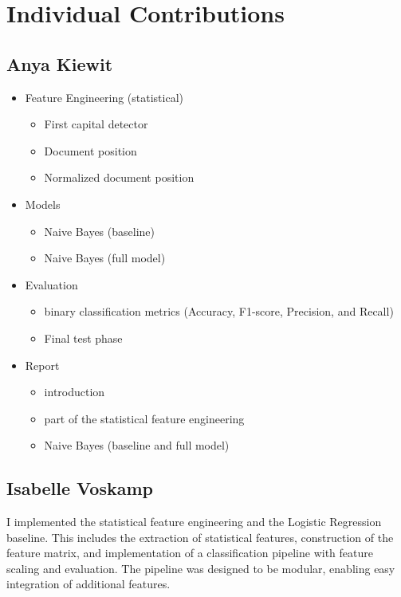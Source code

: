 \documentclass[11pt]{article}
\begin{document}
\section{Individual Contributions}

\subsection{Anya Kiewit}
\begin{itemize}
    \item Feature Engineering (statistical)
          \begin{itemize}
              \item First capital detector
              \item Document position
              \item Normalized document position
          \end{itemize}
    \item Models
          \begin{itemize}
              \item Naive Bayes (baseline)
              \item Naive Bayes (full model)
          \end{itemize}
    \item Evaluation
          \begin{itemize}
              \item binary classification metrics (Accuracy, F1-score, Precision, and Recall)
              \item Final test phase
          \end{itemize}
    \item Report
          \begin{itemize}
              \item introduction
              \item part of the statistical feature engineering
              \item Naive Bayes (baseline and full model)
          \end{itemize}
\end{itemize}


\subsection{Isabelle Voskamp}

I implemented the statistical feature engineering and the Logistic Regression baseline.
This includes the extraction of statistical features, construction of the feature matrix, and implementation of a classification pipeline with
feature scaling and evaluation.
The pipeline was designed to be modular, enabling easy integration of additional features.
\end{document}
